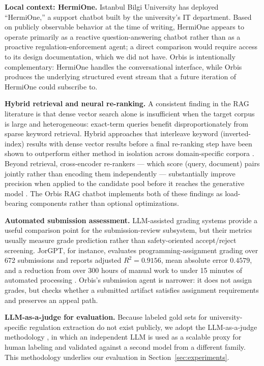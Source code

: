 \documentclass[a4paper,12pt]{article}
\begin{document}
\textbf{Local context: HermiOne.} Istanbul Bilgi University has deployed ``HermiOne,'' a support chatbot built by the university's IT department. Based on publicly observable behavior at the time of writing, HermiOne appears to operate primarily as a reactive question-answering chatbot rather than as a proactive regulation-enforcement agent; a direct comparison would require access to its design documentation, which we did not have. Orbis is intentionally complementary: HermiOne handles the conversational interface, while Orbis produces the underlying structured event stream that a future iteration of HermiOne could subscribe to.

\textbf{Hybrid retrieval and neural re-ranking.} A consistent finding in the RAG literature is that dense vector search alone is insufficient when the target corpus is large and heterogeneous: exact-term queries benefit disproportionately from sparse keyword retrieval. Hybrid approaches that interleave keyword (inverted-index) results with dense vector results before a final re-ranking step have been shown to outperform either method in isolation across domain-specific corpora \cite{kiela2024hybrid}. Beyond retrieval, cross-encoder re-rankers --- which score (query, document) pairs jointly rather than encoding them independently --- substantially improve precision when applied to the candidate pool before it reaches the generative model \cite{gunther2023jina}. The Orbis RAG chatbot implements both of these findings as load-bearing components rather than optional optimizations.

\textbf{Automated submission assessment.} LLM-assisted grading systems provide a useful comparison point for the submission-review subsystem, but their metrics usually measure grade prediction rather than safety-oriented accept/reject screening. JorGPT, for instance, evaluates programming-assignment grading over 672 submissions and reports adjusted $R^2{=}0.9156$, mean absolute error $0.4579$, and a reduction from over 300 hours of manual work to under 15 minutes of automated processing \cite{cisneros2025jorgpt}. Orbis's submission agent is narrower: it does not assign grades, but checks whether a submitted artifact satisfies assignment requirements and preserves an appeal path.

\textbf{LLM-as-a-judge for evaluation.} Because labeled gold sets for university-specific regulation extraction do not exist publicly, we adopt the LLM-as-a-judge methodology \cite{zheng2023judging}, in which an independent LLM is used as a scalable proxy for human labeling and validated against a second model from a different family. This methodology underlies our evaluation in Section~\ref{sec:experiments}.
\end{document}
